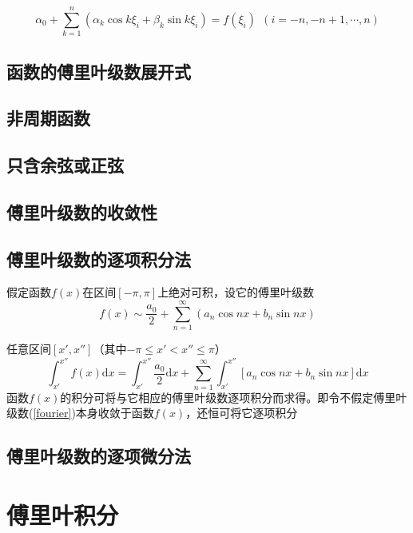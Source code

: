 \documentclass[12pt,a4paper]{article}
\newcommand{\dif}{\mathrm{d}}
\begin{document}
\begin{equation}
\alpha_0 + \sum_{k=1}^{n} (\alpha_k \cos k\xi_i +\beta_k \sin k\xi_i) = f(\xi_i) ~~(i = -n, -n+1, \cdots, n)
\end{equation}


\subsection{函数的傅里叶级数展开式}

\subsection{非周期函数}

\subsection{只含余弦或正弦}


\subsection{傅里叶级数的收敛性}



\subsection{傅里叶级数的逐项积分法}
假定函数$f(x)$在区间$[-\pi,\pi]$上绝对可积，设它的傅里叶级数
\begin{equation}
f(x) \sim \frac{a_0}{2} + \sum_{n=1}^{\infty} (a_n \cos nx +b_n \sin nx)
\label{fourier}
\end{equation}

任意区间$[x', x'']$（其中$-\pi \leq x' < x'' \leq \pi$）
\begin{equation}
\int_{x'}^{x''} f(x) \dif x = \int_{x'}^{x''} \frac{a_0}{2} \dif x +\sum_{n=1}^{\infty} \int_{x'}^{x''} [a_n \cos nx +b_n \sin nx ] \dif x
\end{equation}
函数$f(x)$的积分可将与它相应的傅里叶级数逐项积分而求得。即令不假定傅里叶级数(\ref{fourier})本身收敛于函数$f(x)$，还恒可将它逐项积分

\subsection{傅里叶级数的逐项微分法}


\section{傅里叶积分}
\end{document}
